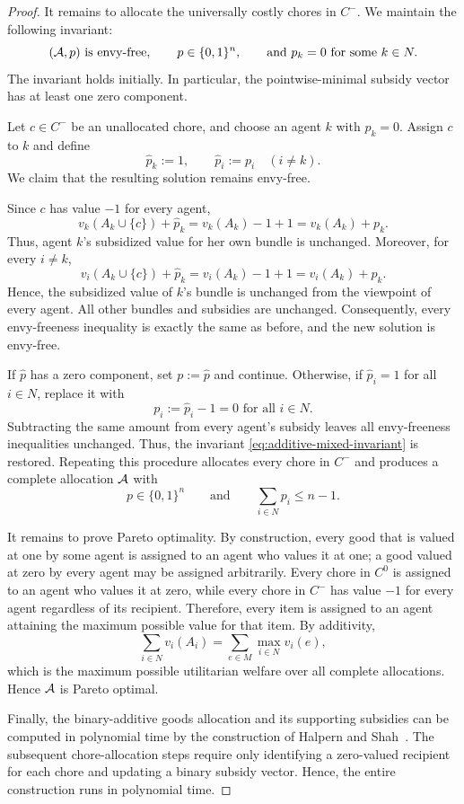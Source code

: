\begin{proof}
It remains to allocate the universally costly chores in $C^-$. We maintain the following invariant:
\begin{equation}\label{eq:additive-mixed-invariant}
(\mathcal{A},p)\text{ is envy-free},\qquad
p\in\{0,1\}^n,
\qquad
\text{and }p_k=0\text{ for some }k\in N.
\end{equation}
The invariant holds initially. In particular, the pointwise-minimal subsidy vector has at least one zero component.

Let $c\in C^-$ be an unallocated chore, and choose an agent $k$ with
$p_k=0$. Assign $c$ to $k$ and define
\[
\widehat p_k:=1,
\qquad
\widehat p_i:=p_i\quad(i\neq k).
\]
We claim that the resulting solution remains envy-free.

Since $c$ has value $-1$ for every agent,
\[
v_k(A_k\cup\{c\})+\widehat p_k
=
v_k(A_k)-1+1
=
v_k(A_k)+p_k.
\]
Thus, agent $k$'s subsidized value for her own bundle is unchanged. Moreover, for every $i\neq k$,
\[
v_i(A_k\cup\{c\})+\widehat p_k
=
v_i(A_k)-1+1
=
v_i(A_k)+p_k.
\]
Hence, the subsidized value of $k$'s bundle is unchanged from the viewpoint of every agent. All other bundles and subsidies are unchanged. Consequently, every envy-freeness inequality is exactly the same as before, and the new solution is envy-free.

If $\widehat p$ has a zero component, set $p:=\widehat p$ and continue. Otherwise, if $\widehat p_i=1$ for all $i\in N$, replace it with
\[
p_i:=\widehat p_i-1=0 \text{ for all } i\in N.
\]
Subtracting the same amount from every agent's subsidy leaves all envy-freeness inequalities unchanged. Thus, the invariant \eqref{eq:additive-mixed-invariant} is restored. Repeating this procedure allocates every chore in $C^-$ and produces a complete allocation $\mathcal{A}$ with
\[
p\in\{0,1\}^n
\qquad\text{and}\qquad
\sum_{i\in N}p_i\leq n-1.
\]

It remains to prove Pareto optimality. By construction, every good that is valued at one by some agent is assigned to an agent who values it at one; a good valued at zero by every agent may be assigned arbitrarily. Every chore in $C^0$ is assigned to an agent who values it at zero, while every chore in $C^-$ has value $-1$ for every agent regardless of its recipient. Therefore, every item is assigned to an agent attaining the maximum possible value for that item. By additivity,
\[
\sum_{i\in N}v_i(A_i)
=
\sum_{e\in M}\max_{i\in N}v_i(e),
\]
which is the maximum possible utilitarian welfare over all complete allocations. Hence $\mathcal{A}$ is Pareto optimal.

Finally, the binary-additive goods allocation and its supporting subsidies can be computed in polynomial time by the construction of Halpern and Shah~\cite{HS19}. The subsequent chore-allocation steps require only identifying a zero-valued recipient for each chore and updating a binary subsidy vector. Hence, the entire construction runs in polynomial time.
\end{proof}
